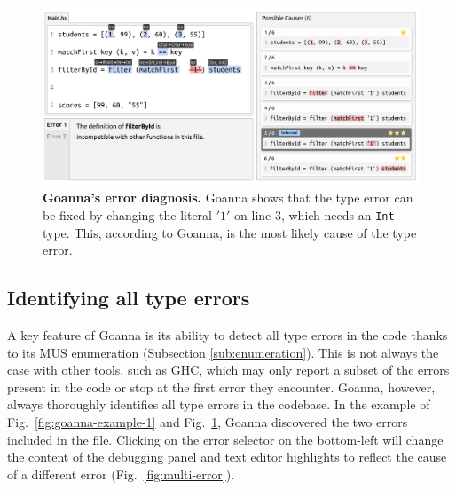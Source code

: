 \documentclass[pdflatex,lineno,sn-nature,Numbered]{sn-jnl}%
\begin{document}
    \begin{figure}[ht!]
        \centering
        \includegraphics[width=\linewidth]{images/goanna-example-2}
        \caption[Goanna's showing possible causes of a type error (2)]{\textbf{Goanna's error diagnosis.} Goanna shows that the type error can be fixed by changing the literal $'1'$ on line 3, which needs an \texttt{Int} type. This, according to Goanna, is the most likely cause of the type error.}
        \label{fig:goanna-example-2}
    \end{figure}


    \subsection{Identifying all type errors} \label{sub:all-errors}
    
    A key feature of Goanna is its ability to detect all type errors in the code thanks to its MUS enumeration (Subsection \ref{sub:enumeration}). This is not always the case with other tools, such as GHC, which may only report a subset of the errors present in the code or stop at the first error they encounter. Goanna, however, always thoroughly identifies all type errors in the codebase. In the example of Fig.~\ref{fig:goanna-example-1} and Fig.~\ref{fig:goanna-example-2}, Goanna discovered the two errors included in the file. Clicking on the error selector on the bottom-left will change the content of the debugging panel and text editor highlights to reflect the cause of a different error (Fig.~\ref{fig:multi-error}). 
\end{document}

